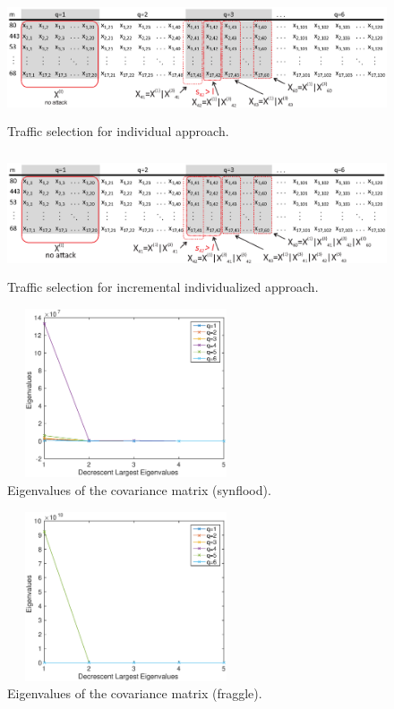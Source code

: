 \documentclass{bmcart}
\begin{document}
\begin{backmatter}
\begin{figure}[h!]
     \includegraphics[height=3.6cm, width=12.4cm]{results/figures/individualized.eps}
     \caption{ Traffic selection for individual approach.}
     \label{fig:fig9}
\end{figure}

\begin{figure}[h!]
     \includegraphics[height=3.6cm, width=12.4cm]{results/figures/incremental_individualized.eps}
     \caption{ Traffic selection for incremental individualized approach.}
     \label{fig:fig2}
\end{figure}

\begin{figure}[h!]
     \includegraphics[height=5cm, width=7cm]{results/figures/eigenvalues_synflood.eps} 
     \caption{ Eigenvalues of the covariance matrix (synflood).}
     \label{fig:fig10}
\end{figure}

\begin{figure}[h!]
     \includegraphics[height=5cm, width=7cm]{results/figures/eigenvalues_fraggle.eps}
     \caption{ Eigenvalues of the covariance matrix (fraggle).}
     \label{fig:fig11}
\end{figure}


\end{backmatter}
\end{document}

